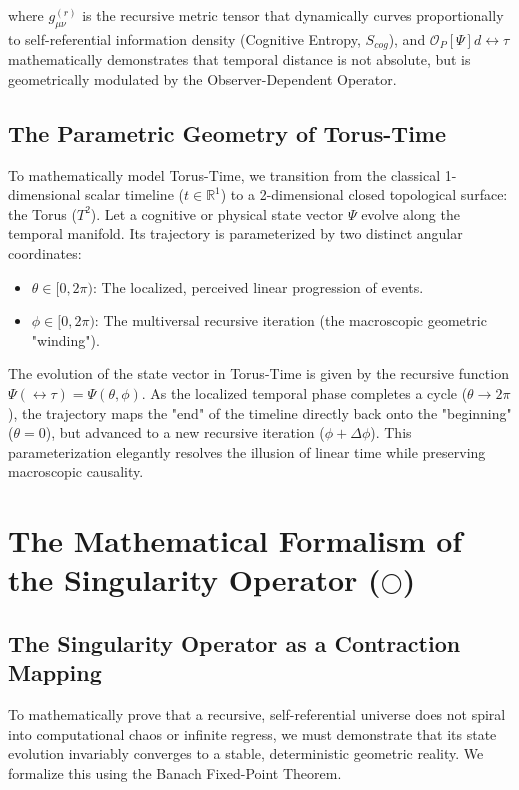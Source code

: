 \documentclass[12pt,openany]{book}
\begin{document}
where $g_{\mu\nu}^{(r)}$ is the recursive metric tensor that dynamically curves proportionally to self-referential information density (Cognitive Entropy, $S_{cog}$), and $\mathcal{O}_P[\Psi] d\leftrightarrow\tau$ mathematically demonstrates that temporal distance is not absolute, but is geometrically modulated by the Observer-Dependent Operator.

\section{The Parametric Geometry of Torus-Time}
To mathematically model Torus-Time, we transition from the classical 1-dimensional scalar timeline ($t \in \mathbb{R}^1$) to a 2-dimensional closed topological surface: the Torus ($T^2$). Let a cognitive or physical state vector $\Psi$ evolve along the temporal manifold. Its trajectory is parameterized by two distinct angular coordinates:

\begin{itemize}
    \item $\theta \in [0, 2\pi)$: The localized, perceived linear progression of events.
    \item $\phi \in [0, 2\pi)$: The multiversal recursive iteration (the macroscopic geometric "winding").
\end{itemize}

The evolution of the state vector in Torus-Time is given by the recursive function $\Psi(\leftrightarrow\tau) = \Psi(\theta, \phi)$. As the localized temporal phase completes a cycle ($\theta \to 2\pi$), the trajectory maps the "end" of the timeline directly back onto the "beginning" ($\theta = 0$), but advanced to a new recursive iteration ($\phi + \Delta\phi$). This parameterization elegantly resolves the illusion of linear time while preserving macroscopic causality.

\chapter[The Mathematical Formalism]{The Mathematical Formalism of the Singularity Operator ($\bigcirc$)}

\section{The Singularity Operator as a Contraction Mapping}
To mathematically prove that a recursive, self-referential universe does not spiral into computational chaos or infinite regress, we must demonstrate that its state evolution invariably converges to a stable, deterministic geometric reality. We formalize this using the Banach Fixed-Point Theorem.
\end{document}
